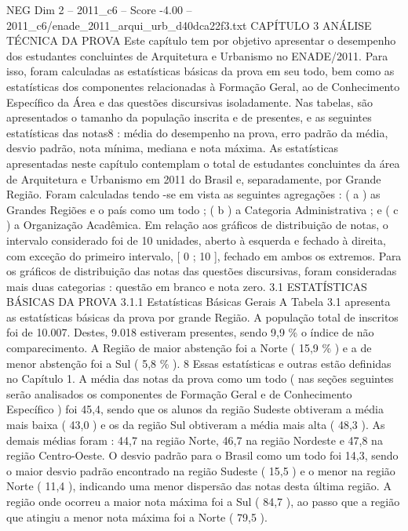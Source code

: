 \begin{textsample}{NEG Dim 2 – 2011\_c6 – Score -4.00 – 2011\_c6/enade\_2011\_arqui\_urb\_d40dca22f3.txt}  \label{ex:f2_neg_028}
CAPÍTULO 3 ANÁLISE TÉCNICA DA PROVA Este capítulo tem por objetivo apresentar o desempenho dos estudantes concluintes de Arquitetura e Urbanismo no ENADE/2011.
Para isso, foram calculadas as estatísticas básicas da prova em seu todo, bem como as estatísticas dos componentes relacionadas à Formação Geral, ao de Conhecimento Específico da Área e das questões discursivas isoladamente.
Nas tabelas, são apresentados o tamanho da população inscrita e de presentes, e as seguintes estatísticas das notas8 : média do desempenho na prova, erro padrão da média, desvio padrão, nota mínima, mediana e nota máxima.
As estatísticas apresentadas neste capítulo contemplam o total de estudantes concluintes da área de Arquitetura e Urbanismo em 2011 do Brasil e, separadamente, por Grande Região.
Foram calculadas tendo -se em vista as seguintes agregações : ( a ) as Grandes Regiões e o país como um todo ; ( b ) a Categoria Administrativa ; e ( c ) a Organização Acadêmica.
Em relação aos gráficos de distribuição de notas, o intervalo considerado foi de 10 unidades, aberto à esquerda e fechado à direita, com exceção do primeiro intervalo, [ 0 ; 10 ], fechado em ambos os extremos.
Para os gráficos de distribuição das notas das questões discursivas, foram consideradas mais duas categorias : questão em branco e nota zero. 3.1 ESTATÍSTICAS BÁSICAS DA PROVA 3.1.1 Estatísticas Básicas Gerais A Tabela 3.1 apresenta as estatísticas básicas da prova por grande Região.
A população total de inscritos foi de 10.007.
Destes, 9.018 estiveram presentes, sendo 9,9 \% o índice de não comparecimento.
A Região de maior abstenção foi a Norte ( 15,9 \% ) e a de menor abstenção foi a Sul ( 5,8 \% ). 8 Essas estatísticas e outras estão definidas no Capítulo 1.
A média das notas da prova como um todo ( nas seções seguintes serão analisados os componentes de Formação Geral e de Conhecimento Específico ) foi 45,4, sendo que os alunos da região Sudeste obtiveram a média mais baixa ( 43,0 ) e os da região Sul obtiveram a média mais alta ( 48,3 ).
As demais médias foram : 44,7 na região Norte, 46,7 na região Nordeste e 47,8 na região Centro-Oeste.
O desvio padrão para o Brasil como um todo foi 14,3, sendo o maior desvio padrão encontrado na região Sudeste ( 15,5 ) e o menor na região Norte ( 11,4 ), indicando uma menor dispersão das notas desta última região.
A região onde ocorreu a maior nota máxima foi a Sul ( 84,7 ), ao passo que a região que atingiu a menor nota máxima foi a Norte ( 79,5 ).

\end{textsample}
